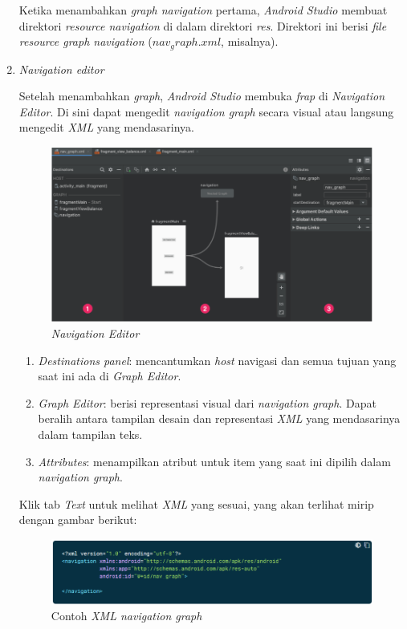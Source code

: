 \begin{enumerate}
Ketika menambahkan \textit{graph navigation} pertama, \textit{Android Studio} membuat direktori \textit{resource navigation} di dalam direktori \textit{res}. Direktori ini berisi \textit{file resource graph navigation} (\textit{$nav_graph.xml$}, misalnya).

\item \emph{Navigation editor}

Setelah menambahkan \textit{graph}, \textit{Android Studio} membuka \textit{frap} di \textit{Navigation Editor}. Di sini dapat mengedit \textit{navigation graph} secara visual atau langsung mengedit \textit{XML} yang mendasarinya.
\begin{figure}[H]
	\centering
	\includegraphics[keepaspectratio, width=12cm]{gambar/navigation_graph2}
	\caption{\textit{Navigation Editor} \citep{developerandroid}}
	\label{gambar:gambar_39}
\end{figure}

	\begin{enumerate}
	\item \textit{Destinations panel}: mencantumkan \textit{host} navigasi dan semua tujuan yang saat ini ada di \textit{Graph Editor}.
	\item 	\textit{Graph Editor}: berisi representasi visual dari \textit{navigation graph}. Dapat beralih antara tampilan desain dan representasi \textit{XML} yang mendasarinya dalam tampilan teks.
	\item \textit{Attributes}: menampilkan atribut untuk item yang saat ini dipilih dalam \textit{navigation graph}.
	\end{enumerate}
	
Klik tab \textit{Text} untuk melihat \textit{XML} yang sesuai, yang akan terlihat mirip dengan gambar berikut:
\begin{figure}[H]
	\centering
	\includegraphics[keepaspectratio, width=12cm]{gambar/navigation_graph3}
	\caption{Contoh \textit{XML navigation graph} \citep{developerandroid}}
	\label{gambar:gambar_40}
\end{figure}


\end{enumerate}
